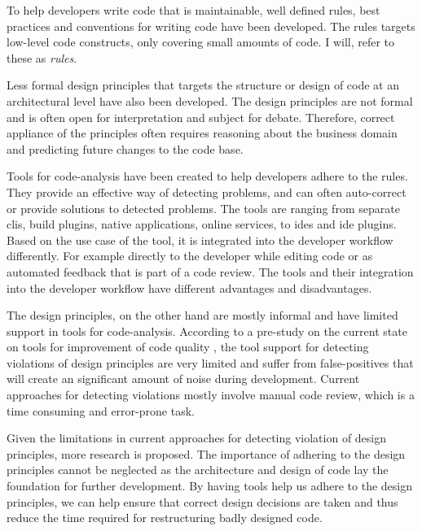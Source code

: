 \documentclass{report}
\begin{document}
To help developers write code that is maintainable, well defined rules, best practices and conventions for writing code have been developed. The rules targets low-level code constructs, only covering small amounts of code. I will, refer to these as \textit{rules}.

Less formal design principles that targets the structure or design of code at an architectural level have also been developed. The design principles are not formal and is often open for interpretation and subject for debate. Therefore, correct appliance of the principles often requires reasoning about the business domain and predicting future changes to the code base. 

Tools for code-analysis have been created to help developers adhere to the rules. They provide an effective way of detecting problems, and can often auto-correct or provide solutions to detected problems. The tools are ranging from separate \gls{cli}s, build plugins, native applications, online services, to \gls{ide}s and \gls{ide} plugins. Based on the use case of the tool, it is integrated into the developer workflow differently. For example directly to the developer while editing code or as automated feedback that is part of a code review.  The tools and their integration into the developer workflow have different advantages and disadvantages.

The design principles, on the other hand are mostly informal and have limited support in tools for code-analysis. According to a pre-study on the current state on tools for improvement of code quality \cite{prestudy}, the tool support for detecting violations of design principles are very limited and suffer from false-positives that will create an significant amount of noise during development. Current approaches for detecting violations mostly involve manual code review, which is a time consuming and error-prone task.

Given the limitations in current approaches for detecting violation of design principles, more research is proposed. The importance of adhering to the design principles cannot be neglected as the architecture and design of code lay the foundation for further development. By having tools help us adhere to the design principles, we can help ensure that correct design decisions are taken and thus reduce the time required for restructuring badly designed code.  
\end{document}
